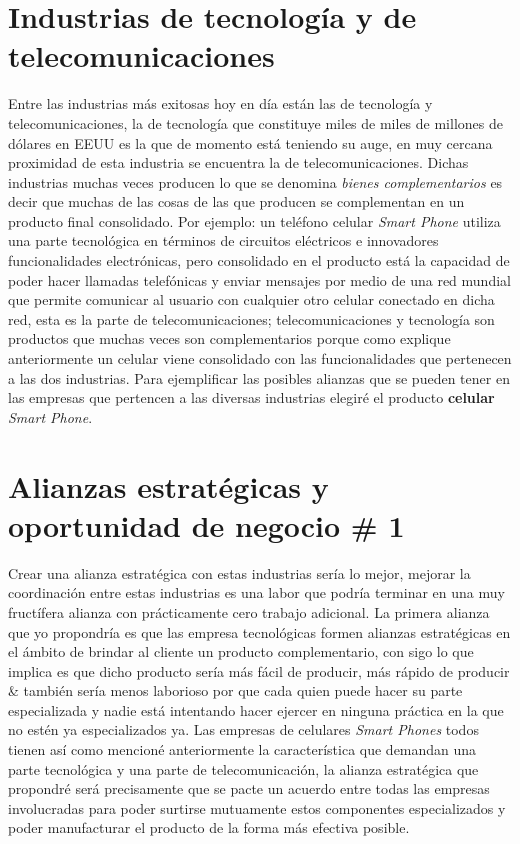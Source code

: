 \documentclass{article}
\begin{document}
\section{Industrias de tecnología y de telecomunicaciones}
Entre las industrias más exitosas hoy en día están las de tecnología y telecomunicaciones, la de tecnología que constituye miles de miles de millones de dólares en EEUU es la que de momento está teniendo su auge, en muy cercana proximidad de esta industria se encuentra la de telecomunicaciones. Dichas industrias muchas veces producen lo que se denomina \emph{bienes complementarios} es decir que muchas de las cosas de las que producen se complementan en un producto final consolidado. Por ejemplo: un teléfono celular \emph{Smart Phone} utiliza una parte tecnológica en términos de circuitos eléctricos e innovadores funcionalidades electrónicas, pero consolidado en el producto está la capacidad de poder hacer llamadas telefónicas y enviar mensajes por medio de una red mundial que permite comunicar al usuario con cualquier otro celular conectado en dicha red, esta es la parte de telecomunicaciones; telecomunicaciones y tecnología son productos que muchas veces son complementarios porque como explique anteriormente un celular viene consolidado con las funcionalidades que pertenecen a las dos industrias. Para ejemplificar las posibles alianzas que se pueden tener en las empresas que pertencen a las diversas industrias elegiré el producto \textbf{celular} \emph{Smart Phone}.


\section{Alianzas estratégicas y oportunidad de negocio \# 1}
Crear una alianza estratégica con estas industrias sería lo mejor, mejorar la coordinación entre estas industrias es una labor que podría terminar en una muy fructífera alianza con prácticamente cero trabajo adicional. La primera alianza que yo propondría es que las empresa tecnológicas formen alianzas estratégicas en el ámbito de brindar al cliente un producto complementario, con sigo lo que implica es que dicho producto sería más fácil de producir, más rápido de producir \& también sería menos laborioso por que cada quien puede hacer su parte especializada y nadie está intentando hacer ejercer en ninguna práctica en la que no estén ya  especializados ya. Las empresas de celulares \emph{Smart Phones} todos tienen así como mencioné anteriormente la característica que demandan una parte tecnológica y una parte de telecomunicación, la alianza estratégica que propondré será precisamente que se pacte un acuerdo entre todas las empresas involucradas para poder surtirse mutuamente estos componentes especializados y poder manufacturar el producto de la forma más efectiva posible.  
\end{document}
